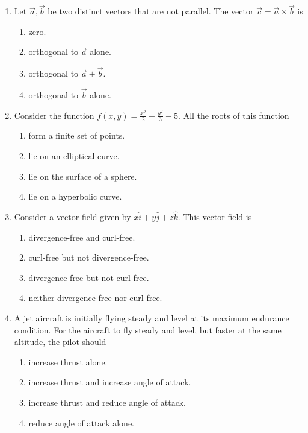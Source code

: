 \documentclass[journal,12pt,onecolumn]{IEEEtran}
\theoremstyle{remark}
\begin{document}
    \begin{enumerate}

    \item Let $\vec{a}, \vec{b}$ be two distinct vectors that are not parallel. The vector $\vec{c}=\vec{a}\times\vec{b}$ is
    \hfill{}

    \begin{enumerate}
        \item zero.
        \item orthogonal to $\vec{a}$ alone.
        \item orthogonal to $\vec{a}+\vec{b}$.
        \item orthogonal to $\vec{b}$ alone.
    \end{enumerate}

    \item Consider the function $f(x,y)=\frac{x^{2}}{2}+\frac{y^{2}}{3}-5$. All the roots of this function
    \hfill{}

    \begin{enumerate}
        \item form a finite set of points.
        \item lie on an elliptical curve.
        \item lie on the surface of a sphere.
        \item lie on a hyperbolic curve.
    \end{enumerate}

    \item Consider a vector field given by $x\hat{i}+y\hat{j}+z\hat{k}.$ This vector field is
    \hfill{}

    \begin{enumerate}
        \item divergence-free and curl-free.
        \item curl-free but not divergence-free.
        \item divergence-free but not curl-free.
        \item neither divergence-free nor curl-free.
    \end{enumerate}

    \item A jet aircraft is initially flying steady and level at its maximum endurance condition. For the aircraft to fly steady and level, but faster at the same altitude, the pilot should
    \hfill{}

    \begin{enumerate}
        \item increase thrust alone.
        \item increase thrust and increase angle of attack.
        \item increase thrust and reduce angle of attack.
        \item reduce angle of attack alone.
    \end{enumerate}


\end{enumerate}
\end{document}
